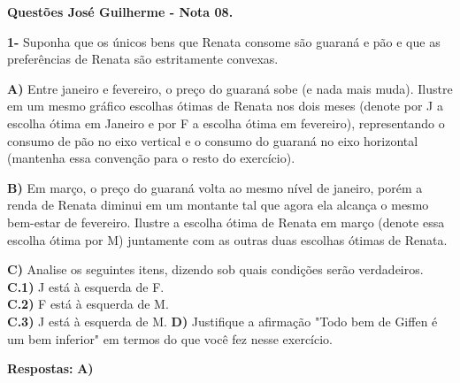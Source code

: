 \documentclass[a4paper, 12pt]{article} %
\begin{document}
\begin{flushleft}
\textbf{Questões José Guilherme - Nota 08.}
\singlespacing

\textbf{1-} Suponha que os únicos bens que Renata consome são guaraná e pão e que as preferências de Renata são estritamente convexas.
\singlespacing

\textbf{A)} Entre janeiro e fevereiro, o preço do guaraná sobe (e nada mais muda). Ilustre em um mesmo gráfico escolhas ótimas de Renata nos dois meses (denote por J a escolha ótima em Janeiro e por F a escolha ótima em fevereiro), representando o consumo de pão no
eixo vertical e o consumo do guaraná no eixo horizontal (mantenha essa convenção para
o resto do exercício).
\singlespacing

\textbf{B)} Em março, o preço do guaraná volta ao mesmo nível de janeiro, porém a renda de Renata diminui em um montante tal que agora ela alcança o mesmo bem-estar de fevereiro. Ilustre a escolha ótima de Renata em março (denote essa escolha ótima por M) juntamente
com as outras duas escolhas ótimas de Renata.
\singlespacing

\textbf{C)} Analise os seguintes itens, dizendo sob quais condições serão verdadeiros.
\\
\textbf{C.1)} J está à esquerda de F.
\\
\textbf{C.2)} F está à esquerda de M.
\\
\textbf{C.3)} J está à esquerda de M.
\singlespacing
\textbf{D)} Justifique a afirmação "Todo bem de Giffen é um bem inferior" em termos do que você fez nesse exercício.

\singlespacing

\textbf{Respostas:}
\singlespacing
\textbf{A)} 
\singlespacing

\begin{center}

\end{center}
\end{flushleft}
\end{document}
